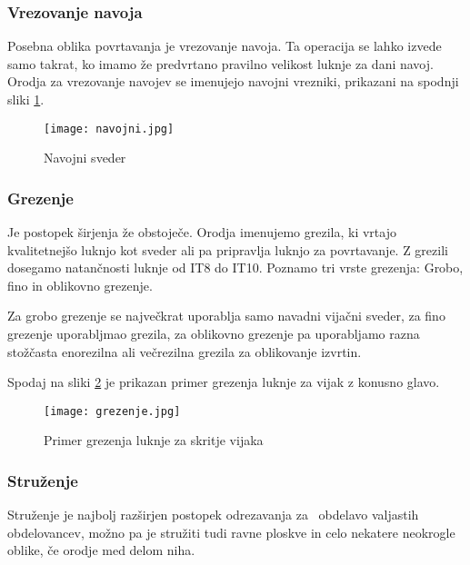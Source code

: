 \subsubsection{Vrezovanje navoja}
Posebna oblika povrtavanja je vrezovanje navoja. Ta operacija se 
lahko izvede samo takrat, ko imamo že predvrtano pravilno 
velikost luknje za dani navoj. Orodja za vrezovanje navojev se 
imenujejo navojni vrezniki, prikazani na spodnji sliki \ref{navojni_sveder}.

\begin{figure}[H]
    \begin{center}
        \texttt{[image: navojni.jpg]}
        \caption{Navojni sveder
        \cite{sts_arhiv}}
        \label{navojni_sveder}
    \end{center}
\end{figure}

\subsubsection{Grezenje}
Je postopek širjenja že obstoječe. Orodja imenujemo grezila, 
ki vrtajo kvalitetnejšo luknjo kot sveder ali pa pripravlja 
luknjo za povrtavanje. Z grezili dosegamo natančnosti luknje od 
IT8 do IT10. Poznamo tri vrste grezenja: Grobo, fino in oblikovno grezenje.

Za grobo grezenje se največkrat uporablja samo navadni vijačni 
sveder, za fino grezenje uporabljmao grezila, za oblikovno grezenje
pa uporabljamo razna stožčasta enorezilna ali večrezilna grezila 
za oblikovanje izvrtin.
 
Spodaj na sliki \ref{grezilo} je prikazan primer grezenja 
luknje za vijak z konusno glavo.

\begin{figure}[H]
    \begin{center}
        \texttt{[image: grezenje.jpg]}
        \caption{Primer grezenja luknje za skritje vijaka
        \cite{sts_arhiv_grezenje}}
        \label{grezilo}
    \end{center}
\end{figure}

\newpage

\subsubsection{Struženje}
Struženje je najbolj razširjen postopek odrezavanja za \
obdelavo valjastih obdelovancev, možno pa je stružiti tudi ravne ploskve 
in celo nekatere neokrogle oblike, če orodje med delom niha.

